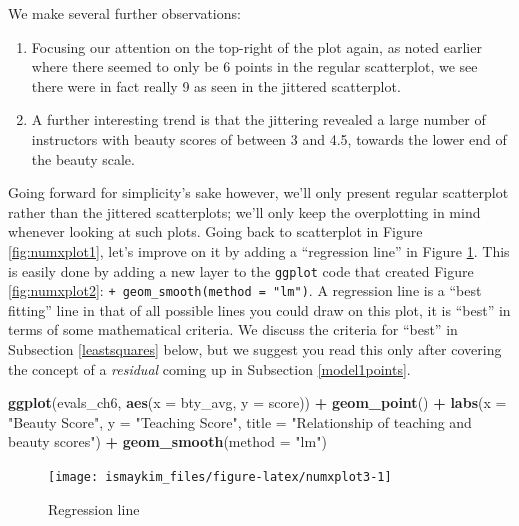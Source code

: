 \documentclass[12pt,]{krantz}
\makeatletter
\newenvironment{Shaded}{\begin{snugshade}}{\end{snugshade}}
\newcommand{\KeywordTok}[1]{\textcolor[rgb]{0.27,0.27,0.27}{\textbf{#1}}}
\newcommand{\DataTypeTok}[1]{\textcolor[rgb]{0.27,0.27,0.27}{#1}}
\newcommand{\StringTok}[1]{\textcolor[rgb]{0.5,0.5,0.5}{#1}}
\newcommand{\OperatorTok}[1]{\textcolor[rgb]{0.43,0.43,0.43}{\textbf{#1}}}
\newcommand{\NormalTok}[1]{#1}
\providecommand{\tightlist}{%
  \setlength{\itemsep}{0pt}\setlength{\parskip}{0pt}}
\newenvironment{kframe}{%
\medskip{}
\setlength{\fboxsep}{.8em}
 \def\at@end@of@kframe{}%
 \ifinner\ifhmode%
  \def\at@end@of@kframe{\end{minipage}}%
  \begin{minipage}{\columnwidth}%
 \fi\fi%
 \def\FrameCommand##1{\hskip\@totalleftmargin \hskip-\fboxsep
 \colorbox{shadecolor}{##1}\hskip-\fboxsep
     \hskip-\linewidth \hskip-\@totalleftmargin \hskip\columnwidth}%
 \MakeFramed {\advance\hsize-\width
   \@totalleftmargin\z@ \linewidth\hsize
   \@setminipage}}%
 {\par\unskip\endMakeFramed%
 \at@end@of@kframe}
\renewenvironment{Shaded}{\begin{kframe}}{\end{kframe}}
\theoremstyle{definition}
\theoremstyle{definition}
\theoremstyle{definition}
\theoremstyle{remark}
\makeatother
\begin{document}
We make several further observations:

\begin{enumerate}
\def\labelenumi{\arabic{enumi}.}
\tightlist
\item
  Focusing our attention on the top-right of the plot again, as noted
  earlier where there seemed to only be 6 points in the regular
  scatterplot, we see there were in fact really 9 as seen in the
  jittered scatterplot.
\item
  A further interesting trend is that the jittering revealed a large
  number of instructors with beauty scores of between 3 and 4.5, towards
  the lower end of the beauty scale.
\end{enumerate}

Going forward for simplicity's sake however, we'll only present regular
scatterplot rather than the jittered scatterplots; we'll only keep the
overplotting in mind whenever looking at such plots. Going back to
scatterplot in Figure \ref{fig:numxplot1}, let's improve on it by adding
a ``regression line'' in Figure \ref{fig:numxplot3}. This is easily done
by adding a new layer to the \texttt{ggplot} code that created Figure
\ref{fig:numxplot2}: \texttt{+\ geom\_smooth(method\ =\ "lm")}. A
regression line is a ``best fitting'' line in that of all possible lines
you could draw on this plot, it is ``best'' in terms of some
mathematical criteria. We discuss the criteria for ``best'' in
Subsection \ref{leastsquares} below, but we suggest you read this only
after covering the concept of a \emph{residual} coming up in Subsection
\ref{model1points}.

\begin{Shaded}
\begin{Highlighting}[]
\KeywordTok{ggplot}\NormalTok{(evals_ch6, }\KeywordTok{aes}\NormalTok{(}\DataTypeTok{x =}\NormalTok{ bty_avg, }\DataTypeTok{y =}\NormalTok{ score)) }\OperatorTok{+}
\StringTok{  }\KeywordTok{geom_point}\NormalTok{() }\OperatorTok{+}
\StringTok{  }\KeywordTok{labs}\NormalTok{(}\DataTypeTok{x =} \StringTok{"Beauty Score"}\NormalTok{, }\DataTypeTok{y =} \StringTok{"Teaching Score"}\NormalTok{, }
       \DataTypeTok{title =} \StringTok{"Relationship of teaching and beauty scores"}\NormalTok{) }\OperatorTok{+}\StringTok{  }
\StringTok{  }\KeywordTok{geom_smooth}\NormalTok{(}\DataTypeTok{method =} \StringTok{"lm"}\NormalTok{)}
\end{Highlighting}
\end{Shaded}

\begin{figure}

{\centering \texttt{[image: ismaykim\_files/figure-latex/numxplot3-1]} 

}

\caption{Regression line}\label{fig:numxplot3}
\end{figure}
\end{document}
